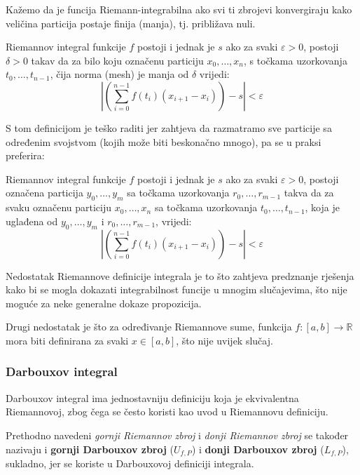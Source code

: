Kažemo da je funcija Riemann-integrabilna ako svi ti zbrojevi konvergiraju kako
veličina particija postaje finija (manja), tj. približava nuli. 

\begin{definition}
    Riemannov integral funkcije $f$ postoji i jednak je $s$ ako za svaki
    $\varepsilon > 0$, postoji $\delta > 0$ takav da za bilo koju označenu
    particiju $x_0, \dots, x_n$, s točkama uzorkovanja $t_0, \dots, t_{n-1}$,
    čija norma (mesh) je manja od $\delta$ vrijedi:
    $$
        \left|\left( \sum_{i=0}^{n-1} f(t_i)(x_{i+1} - x_i) \right) - s\right| < \varepsilon
    $$
\end{definition}

S tom definicijom je teško raditi jer zahtjeva da razmatramo sve particije sa
određenim svojstvom (kojih može biti beskonačno mnogo), pa se u praksi
preferira:

\begin{definition}
    Riemannov integral funkcije $f$ postoji i jednak je $s$ ako za svaki
    $\varepsilon > 0$, postoji označena particija $y_0, \dots, y_m$ sa točkama
    uzorkovanja $r_0, \dots, r_{m-1}$ takva da za svaku označenu particiju
    $x_0, \dots, x_n$ sa točkama uzorkovanja $t_0, \dots, t_{n-1}$, koja je uglađena
    od $y_0, \dots, y_m$ i $r_0, \dots, r_{m-1}$, vrijedi:
    $$
        \left|\left( \sum_{i=0}^{n-1} f(t_i)(x_{i+1} - x_i) \right) - s\right| < \varepsilon
    $$
\end{definition}

Nedostatak Riemannove definicije integrala je to što zahtjeva predznanje
rješenja kako bi se mogla dokazati integrabilnost funcije u mnogim slučajevima,
što nije moguće za neke generalne dokaze propozicija.

Drugi nedostatak je što za određivanje Riemannove sume, funkcija $f: [a, b] \to \mathbb{R}$
mora biti definirana za svaki $x \in [a, b]$, što nije uvijek slučaj.

\subsubsection{Darbouxov integral}

Darbouxov integral ima jednostavniju definiciju koja je ekvivalentna
Riemannovoj, zbog čega se često koristi kao uvod u Riemannovu definiciju.

Prethodno navedeni \textit{gornji Riemannov zbroj} i \textit{donji Riemannov
zbroj} se također nazivaju i \textbf{gornji Darbouxov zbroj} ($U_{f,P}$) i
\textbf{donji Darbouxov zbroj} ($L_{f,P}$), sukladno, jer se koriste u
Darbouxovoj definiciji integrala.

